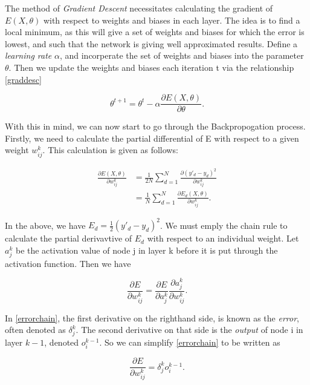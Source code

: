 The method of \textit{Gradient Descent} necessitates calculating the gradient of $E(X,\theta)$ with respect to weights and biases in each layer. The idea is to find a local minimum, as this will
give a set of weights and biases for which the error is lowest, and such that the network is giving well approximated results. Define a \textit{learning rate} $\alpha$, and incorperate the set of weights
and biases into the parameter $\theta$. Then we update the weights and biases each iteration t via the relationship \ref{graddesc}

\begin{equation}
    \label{graddesc}
    \theta^{t+1} = \theta^t - \alpha\frac{\partial E(X,\theta)}{\partial \theta}.
\end{equation}

With this in mind, we can now start to go through the Backpropogation process. Firstly, we need to calculate the partial differential of E with respect to a given weight $w^k_{ij}$. This calculation is given as follows:

\begin{align}
    \frac{\partial E(X,\theta)}{\partial w_{ij}^k} &= \frac{1}{2N}\sum_{d=1}^N\frac{\partial (y'_d-y_d)^2}{\partial w_{ij}^k} \\
                                                   &= \frac{1}{N}\sum^N_{d=1} \frac{\partial E_d(X,\theta)}{\partial w_{ij}^k}.
\end{align}

In the above, we have $E_d = \frac{1}{2}(y'_d-y_d)^2$.  We must emply the chain rule to calculate the partial derivavtive of $E_d$ with respect to an individual weight. 
Let $a_j^k$ be the activation value of node j in layer k before it is put through the activation function. Then we have

\begin{equation}
    \label{errorchain}
    \frac{\partial E}{\partial w_{ij}^k} = \frac{\partial E}{\partial a_j^k}\frac{\partial a_j^k}{\partial w_{ij}^k}.
\end{equation}

In \ref{errorchain}, the first derivative on the righthand side, is known as the \textit{error}, often denoted as $\delta_j^k$. The second derivative on that side
is the \textit{output} of node i in layer $k-1$, denoted $o_i^{k-1}$. So we can simplify \ref{errorchain} to be written as

\begin{equation}
    \frac{\partial E}{\partial w_{ij}^k} = \delta^k_jo_i^{k-1}.
\end{equation}

